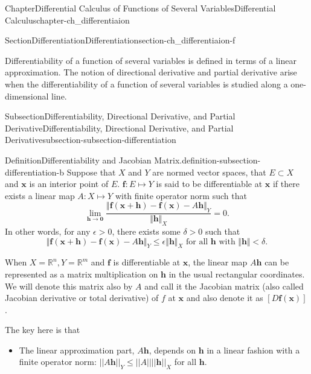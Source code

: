 \documentclass[oneside,10pt,]{book}
\numberwithin{equation}{section}
\newcommand{\bff}{\mathbf{f}}
\newcommand{\bh}{\mathbf{h}}
\newcommand{\bx}{\mathbf{x}}
\newcommand{\bbR}{\mathbb{R}}
\begin{document}
\begin{chapterptx}{Chapter}{Differential Calculus of Functions of Several Variables}{}{Differential Calculus}{}{}{chapter-ch_differentiaion}
\begin{sectionptx}{Section}{Differentiation}{}{Differentiation}{}{}{section-ch_differentiaion-f}
\begin{introduction}{}
Differentiability of a function of several variables is defined in terms of a linear approximation. The notion of directional derivative and partial derivative arise when the differentiability of a function of several variables is studied along a one-dimensional line.\end{introduction}%
%
%
\typeout{************************************************}
\typeout{************************************************}
%
\begin{subsectionptx}{Subsection}{Differentiability, Directional Derivative, and Partial Derivative}{}{Differentiability, Directional Derivative, and Partial Derivative}{}{}{subsection-subsection-differentiation}
\begin{definition}{Definition}{Differentiability and Jacobian Matrix.}{definition-subsection-differentiation-b}%
Suppose that \(X\) and \(Y\) are normed  vector spaces, that \(E\subset X\) and \(\bx\) is an interior point of \(E\). \({\mathbf f}:E\mapsto Y\) is said to be differentiable at \(\mathbf x\) if there exists a linear map \(A: X\mapsto Y\) with finite operator norm such that%
\begin{equation}
\lim_{{\mathbf h}\to {\mathbf 0}}
\frac{\Vert {\mathbf f}({\mathbf x}+{\mathbf h})- {\mathbf f}({\mathbf x})-A{\mathbf h} \Vert_{Y}}{\Vert {\mathbf h} \Vert_{X}}=0.\label{men-eq-diff}
\end{equation}
In other words, for any \(\epsilon >0\), there exists some \(\delta>0\) such that%
\begin{equation*}
\Vert {\mathbf f}({\mathbf x}+{\mathbf h})- {\mathbf f}({\mathbf x})-A{\mathbf h}\Vert_{Y}
\le \epsilon \Vert {\mathbf h} \Vert_{X}
\text{ for all } {\mathbf h} \text { with } \Vert {\mathbf h} \Vert < \delta.
\end{equation*}
%
\par
When \(X=\bbR^{n}, Y=\bbR^{m}\) and \(\bff\) is differentiable at \(\bx\), the linear map \(A\bh\) can be represented as a matrix multiplication on \(\bh\) in the usual rectangular coordinates. We will denote this matrix also by \(A\) and call it the Jacobian matrix (also called Jacobian derivative or total derivative) of \(f\) at \(\bx\) and also denote it as \([D\mathbf f (\bx)]\).%
\end{definition}
The key here is that%
\begin{itemize}[label=\textbullet]
\item{}The linear approximation part, \(A {\mathbf h}\), depends on \({\mathbf h}\) in a linear fashion with a finite operator norm: \(||A {\mathbf h}||_{Y}\le ||A|| ||{\mathbf h}||_{X}\) for all \({\mathbf h}\).%

\end{itemize}
\end{subsectionptx}
\end{sectionptx}
\end{chapterptx}
\end{document}
